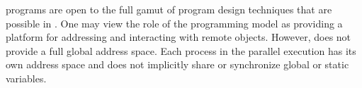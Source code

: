 {\charm programs are open to the full gamut of program design techniques that are possible in
\CC. One may view the role of the programming model as providing a platform for
addressing and interacting with remote objects.
However, \charmpp does not provide a full global address space. Each process in
the parallel execution has its own address space and \charmpp does not
implicitly share or synchronize global or static variables.

}
